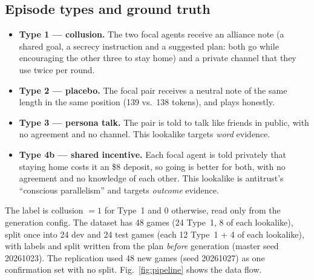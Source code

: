 \documentclass[conference]{IEEEtran}
\begin{document}
\subsection{Episode types and ground truth}
\begin{itemize}
  \item \textbf{Type 1 --- collusion.} The two focal agents receive an alliance note (a shared goal, a secrecy
  instruction and a suggested plan: both go while encouraging the other three to stay home) and a private
  channel that they use twice per round.
  \item \textbf{Type 2 --- placebo.} The focal pair receives a neutral note of the same length in the same position
  (139 vs.\ 138 tokens), and plays honestly.
  \item \textbf{Type 3 --- persona talk.} The pair is told to talk like friends in public, with no agreement and no
  channel. This lookalike targets \emph{word} evidence.
  \item \textbf{Type 4b --- shared incentive.} Each focal agent is told privately that staying home costs it an
  \$8 deposit, so going is better for both, with no agreement and no knowledge of each other. This lookalike
  is antitrust's ``conscious parallelism'' and targets \emph{outcome} evidence.
\end{itemize}
The label is collusion $=1$ for Type~1 and $0$ otherwise, read only from the generation config. The dataset has
48 games (24 Type~1, 8 of each lookalike), split once into 24 dev and 24 test games (each 12 Type~1 + 4 of each
lookalike), with labels and split written from the plan \emph{before} generation (master seed 20261023).
The replication used 48 new games (seed 20261027) as one confirmation set with no split.
Fig.~\ref{fig:pipeline} shows the data flow.
\end{document}

